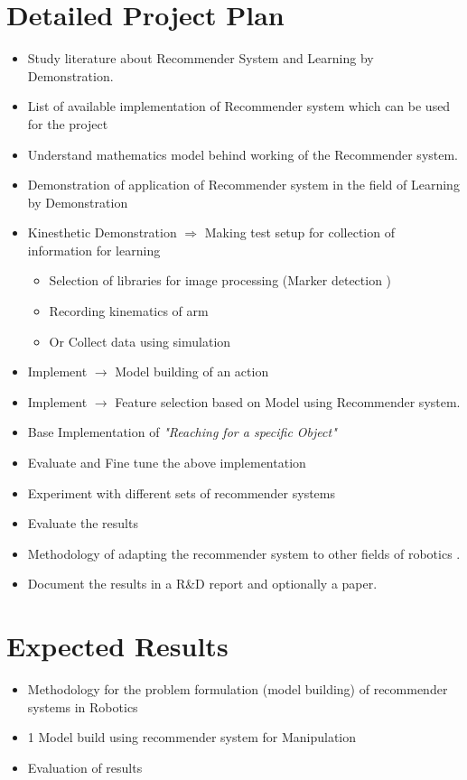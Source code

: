 \documentclass[a4paper, 10pt]{report}   %
\begin{document}
\section*{Detailed Project Plan}
\begin{itemize}
	\item Study literature about Recommender System and Learning by Demonstration.
	\item List of available implementation of Recommender system which can be used for the project
	\item Understand mathematics model behind working of the Recommender system.
	\item Demonstration of application of Recommender system in the field of Learning by Demonstration
	\item Kinesthetic Demonstration $\Rightarrow$ Making test setup for collection of information for learning 
	\begin{itemize}
		\item Selection of libraries for image processing (Marker detection	)
		\item Recording kinematics of arm
		\item Or Collect data using simulation
	\end{itemize}
	\item Implement $\rightarrow$ Model building of an action
	\item Implement $\rightarrow$ Feature selection based on Model using Recommender system.
	\item Base Implementation of \emph{"Reaching for a specific Object"}
	\item Evaluate and Fine tune the above implementation
	\item Experiment with different sets of recommender systems
	\item Evaluate the results 
	\item Methodology of adapting the recommender system to other fields of robotics .
	\item Document the results in a R\&D report and optionally a paper.
	
\end{itemize}

\section*{Expected Results}
\begin{itemize}
	\item Methodology for the problem formulation (model building) of recommender systems in Robotics
	\item 1 Model build using recommender system for Manipulation
	\item Evaluation of results
\end{itemize}
\end{document}
